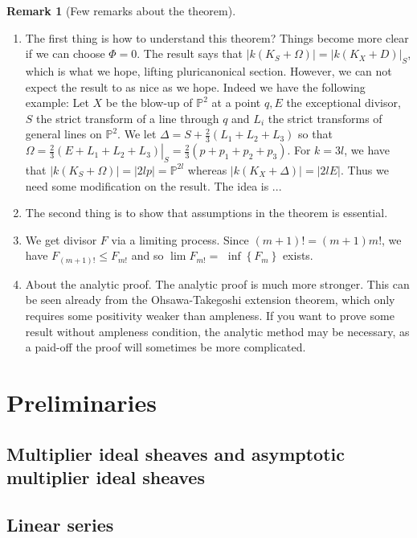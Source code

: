 \documentclass[11pt]{article}
\theoremstyle{definition}
\newtheorem{remark}[theorem]{Remark}
\begin{document}
	\begin{remark}[Few remarks about the theorem]~\\
		\begin{enumerate}
			\item The first thing is how to understand this theorem? Things become more clear if we can choose $\Phi = 0$. The result says that $|k(K_S+\Omega)| = |k(K_X+D)|_S$, which is what we hope, lifting pluricanonical section. However, we can not expect the result to as nice as we hope. Indeed we have the following example: Let $X$ be the blow-up of $\mathbb{P}^2$ at a point $q, E$ the exceptional divisor, $S$ the strict transform of a line through $q$ and $L_i$ the strict transforms of general lines on $\mathbb{P}^2$. We let $\Delta=S+\frac{2}{3}\left(L_1+L_2+L_3\right)$ so that $\Omega=\left.\frac{2}{3}\left(E+L_1+L_2+L_3\right)\right|_S=\frac{2}{3}\left(p+p_1+p_2+p_3\right)$. For $k=3 l$, we have that $\left|k\left(K_S+\Omega\right)\right|=|2 l p|=\mathbb{P}^{2 l}$ whereas $\left|k\left(K_X+\Delta\right)\right|=|2 l E|$. Thus we need some modification on the result. The idea is ...
			\item The second thing is to show that assumptions in the theorem is essential. 
			\item We get divisor $F$ via a limiting process. Since $(m+1)!=(m+1) m!$, we have $F_{(m+1)!} \leq F_{m!}$ and so $\lim F_{m!}=$ $\inf \left\{F_m\right\}$ exists.
			\item About the analytic proof. The analytic proof is much more stronger. This can be seen already from the Ohsawa-Takegoshi extension theorem, which only requires some positivity weaker than ampleness. If you want to prove some result without ampleness condition, the analytic method may be necessary, as a paid-off the proof will sometimes be more complicated.
		\end{enumerate}
	\end{remark}
	\section{Preliminaries}
	
	
	\subsection{Multiplier ideal sheaves and asymptotic multiplier ideal sheaves}
	

	\subsection{Linear series}
	
\end{document}

